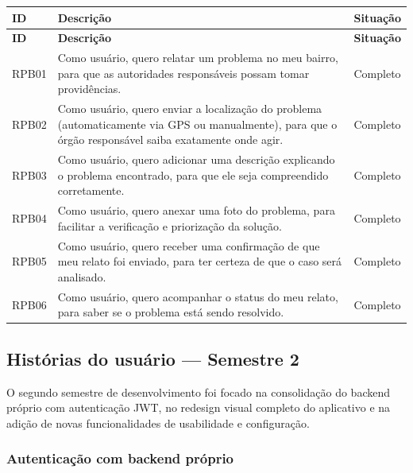 \begin{longtable}{|p{2cm}|p{9cm}|p{2.5cm}|}
  \hline
  \textbf{ID} & \textbf{Descrição} & \textbf{Situação} \\
  \hline
  \endfirsthead
  \hline
  \textbf{ID} & \textbf{Descrição} & \textbf{Situação} \\
  \hline
  \endhead
  RPB01 & Como usuário, quero relatar um problema no meu bairro, para que as autoridades responsáveis possam tomar providências. & Completo \\
  \hline
  RPB02 & Como usuário, quero enviar a localização do problema (automaticamente via GPS ou manualmente), para que o órgão responsável saiba exatamente onde agir. & Completo \\
  \hline
  RPB03 & Como usuário, quero adicionar uma descrição explicando o problema encontrado, para que ele seja compreendido corretamente. & Completo \\
  \hline
  RPB04 & Como usuário, quero anexar uma foto do problema, para facilitar a verificação e priorização da solução. & Completo \\
  \hline
  RPB05 & Como usuário, quero receber uma confirmação de que meu relato foi enviado, para ter certeza de que o caso será analisado. & Completo \\
  \hline
  RPB06 & Como usuário, quero acompanhar o status do meu relato, para saber se o problema está sendo resolvido. & Completo \\
  \hline
\end{longtable}

\subsection{Histórias do usuário — Semestre 2}

O segundo semestre de desenvolvimento foi focado na consolidação do backend
próprio com autenticação JWT, no redesign visual completo do aplicativo e na
adição de novas funcionalidades de usabilidade e configuração.

\subsubsection{Autenticação com backend próprio}

